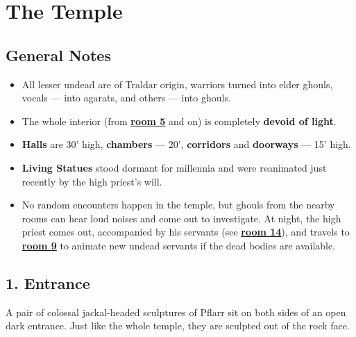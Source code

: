 \documentclass[english,11pt,openany,letterpaper,twocolumn]{book}
\begin{document}
\skipline[0pt]

\noindent
\begin{minipage}{\textwidth}
	\setmonofont{TruetypewriterPolyglOTT}
	\renewcommand{\FancyVerbFormatLine}[1]{\vspace*{-0.5ex}#1}
	{\hfill
	\hfill}
\end{minipage}

\vfill
\break


\chapter{The Temple}

\section{General Notes}

\begin{itemize}[leftmargin=*]
\item
All lesser undead are of Traldar origin, warriors turned into elder ghouls, vocals --- into agarats, and others --- into ghouls.
\item
The whole interior (from \hyperlink{room5}{\textbf{room 5}} and on) is completely \textbf{devoid of light}.
\item
\textbf{Halls} are 30' high, \textbf{chambers} --- 20', \textbf{corridors} and \textbf{doorways} --- 15' high.
\item \textbf{Living Statues} stood dormant for millennia and were reanimated just recently by the high priest's will.
\item No random encounters happen in the temple, but ghouls from the nearby rooms can hear loud noises and come out to investigate. At night, the high priest comes out, accompanied by his servants (see \hyperlink{room14}{\textbf{room 14}}), and travels to \hyperlink{room9}{\textbf{room 9}} to animate new undead servants if the dead bodies are available.
\end{itemize}


\hypertarget{room1}{}
\section{1. Entrance}

A pair of colossal jackal-headed sculptures of Pflarr sit on both sides of an open dark entrance. Just like the whole temple, they are sculpted out of the rock face.
\end{document}
